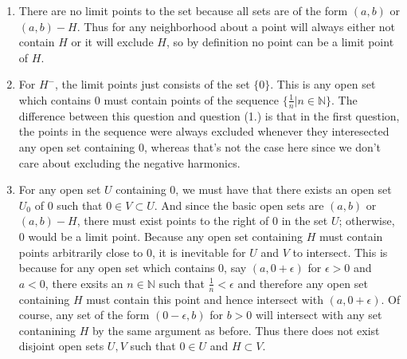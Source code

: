 \documentclass[a4paper,12pt,twoside]{hmcpset}
\begin{document}
\begin{solution}
    \begin{enumerate}
        \item There are no limit points to the set because all sets are of the
        form $(a,b)$ or $(a,b) - H$. Thus for any neighborhood about a point
        will always either not contain $H$ or it will exclude $H$, so by
        definition no point can be a limit point of $H$. 
    
        \item For $H^{-}$, the limit points just consists of the set $\{0\}$.
        This is any open set which contains 0 must contain points of the
        sequence $\{\frac{1}{n} | n \in \mathbb{N}\}$. The difference between
        this question and question (1.) is that in the first question, the
        points in the sequence were always excluded whenever they interesected
        any open set containing 0, whereas that's not the case here since we
        don't care about excluding the negative harmonics.
    
        \item For any open set $U$ containing 0, we must have that there exists
        an open set $U_0$ of 0 such that $0 \in V \subset U$. And since the
        basic open sets are $(a, b)$ or $(a, b) - H$, there must exist points
        to the right of 0 in the set $U$; otherwise, 0 would be a limit point.
        Because any open set containing $H$ must contain points arbitrarily
        close to 0, it is inevitable for $U$ and $V$ to intersect. This is
        because for any open set which contains $0$, say $(a, 0 + \epsilon)$
        for $\epsilon > 0$ and $a < 0$, there exsits an $n \in \mathbb{N}$
        such that $\frac{1}{n} < \epsilon$ and therefore any open set
        containing $H$ must contain this point and hence intersect with $(a, 0
        + \epsilon)$. Of course, any set of the form $(0 - \epsilon, b)$ for
        $b > 0$ will intersect with any set contanining $H$ by the same
        argument as before. Thus there does not exist disjoint open sets $U,
        V$ such that $0 \in U$ and $H \subset V$. 
    
    \end{enumerate}
\end{solution}
\end{document}
